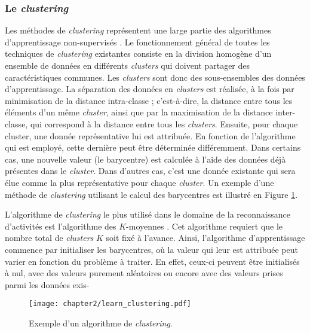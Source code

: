 \subsubsection{Le \textit{clustering}}

Les méthodes de \textit{clustering} représentent une large partie des algorithmes d'apprentissage non-supervisés \citep{Witten2016}. Le fonctionnement général de toutes les techniques de \textit{clustering} existantes consiste en la division homogène d'un ensemble de données en différents \textit{clusters} qui doivent partager des caractéristiques communes. Les \textit{clusters} sont donc des sous-ensembles des données d'apprentissage. La séparation des données en \textit{clusters} est réalisée, à la fois par minimisation de la distance intra-classe ; c'est-à-dire, la distance entre tous les éléments d'un même \textit{cluster}, ainsi que par la maximisation de la distance inter-classe, qui correspond à la distance entre tous les \textit{clusters}. Ensuite, pour chaque cluster, une donnée représentative lui est attribuée. En fonction de l'algorithme qui est employé, cette dernière peut être déterminée différemment. Dans certains cas, une nouvelle valeur (le barycentre) est calculée à l'aide des données déjà présentes dans le \textit{cluster}. Dans d'autres cas, c'est une donnée existante qui sera élue comme la plus représentative pour chaque \textit{cluster}. Un exemple d'une méthode de \textit{clustering} utilisant le calcul des barycentres est illustré en Figure \ref{fig:learn_clustering}.

L'algorithme de \textit{clustering} le plus utilisé dans le domaine de la reconnaissance d'activités est l'algorithme des $K$-moyennes \citep{Messing2009, Kovashka2010}. Cet algorithme requiert que le nombre total de \textit{clusters} $K$ soit fixé à l'avance. Ainsi, l'algorithme d'apprentissage commence par initialiser les barycentres, où la valeur qui leur est attribuée peut varier en fonction du problème à traiter. En effet, ceux-ci peuvent être initialisés à nul, avec des valeurs purement aléatoires ou encore avec des valeurs prises parmi les données exis-

\begin{figure}[H]
	\centering
	\texttt{[image: chapter2/learn\_clustering.pdf]}
	\caption{Exemple d'un algorithme de \textit{clustering}.}
	\label{fig:learn_clustering}
\end{figure}

